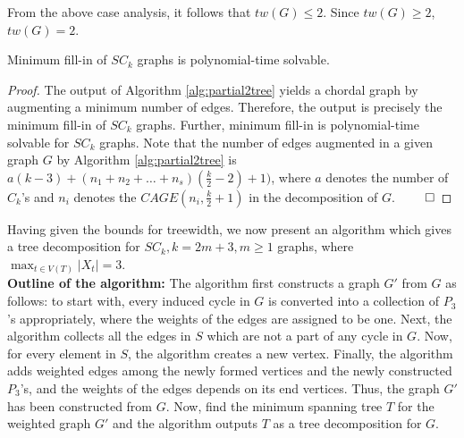 \documentclass[runningheads]{llncs}
\begin{document}
\noindent From the above case analysis, it follows that $tw(G) \leq 2$. Since $tw(G) \geq 2$, $tw(G) = 2$.

\begin{corollary}
\label{minfillin}
Minimum fill-in of $SC_k$ graphs is polynomial-time solvable.
\end{corollary}
\begin{proof}
The output of Algorithm \ref{alg:partial2tree} yields a chordal graph by augmenting a minimum number of edges. Therefore, the output is precisely the minimum fill-in of $SC_k$ graphs. Further, minimum fill-in is polynomial-time solvable for $SC_k$ graphs. Note that the number of edges augmented in a given graph $G$ by Algorithm \ref{alg:partial2tree} is $a(k-3)+(n_1+n_2+\ldots +n_s)(\frac{k}{2}-2)+1)$, where $a$ denotes the number of $C_k$'s and $n_i$ denotes the $CAGE(n_i,\frac{k}{2}+1)$ in the decomposition of $G$.
$\hfill \qed$
\end{proof}

\noindent Having given the bounds for treewidth, we now present an algorithm which gives a tree decomposition for $SC_k, k =2m+3, m \geq 1$ graphs, where $\max_{t \in V(T)} \vert X_t \vert = 3$.\\

\noindent \textbf{Outline of the algorithm:}
The algorithm first constructs a graph $G'$ from $G$ as follows: to start with, every induced cycle in $G$ is converted into a collection of $P_3$'s appropriately, where the weights of the edges are assigned to be one. Next, the algorithm collects all the edges in $S$ which are not a part of any cycle in $G$. Now, for every element in $S$, the algorithm creates a new vertex. Finally, the algorithm adds weighted edges among the newly formed vertices and the newly constructed $P_3$'s, and the weights of the edges depends on its end vertices.  Thus, the graph $G'$ has been constructed from $G$. Now, find the minimum spanning tree $T$ for the weighted graph $G'$ and the algorithm outputs $T$ as a tree decomposition for $G$.
\end{document}

